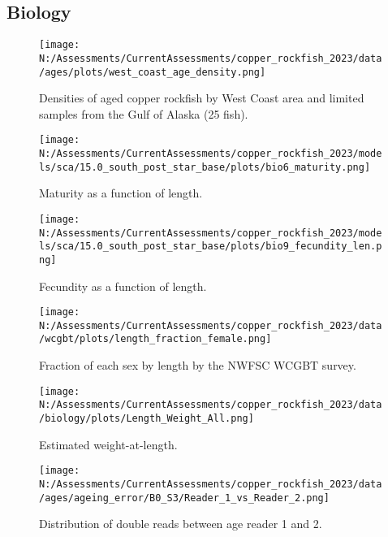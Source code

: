 \documentclass[11pt,
  english,
  letterpaper,
]{article}
\begin{document}
\hypertarget{biology}{%
\subsection{Biology}\label{biology}}

\begin{figure}
\centering
\texttt{[image: N:/Assessments/CurrentAssessments/copper\_rockfish\_2023/data/ages/plots/west\_coast\_age\_density.png]}
\caption{Densities of aged copper rockfish by West Coast area and limited samples from the Gulf of Alaska (25 fish).\label{fig:west-coast-age-density}}
\end{figure}

\pagebreak

\begin{figure}
\centering
\texttt{[image: N:/Assessments/CurrentAssessments/copper\_rockfish\_2023/models/sca/15.0\_south\_post\_star\_base/plots/bio6\_maturity.png]}
\caption{Maturity as a function of length.\label{fig:maturity}}
\end{figure}

\pagebreak

\begin{figure}
\centering
\texttt{[image: N:/Assessments/CurrentAssessments/copper\_rockfish\_2023/models/sca/15.0\_south\_post\_star\_base/plots/bio9\_fecundity\_len.png]}
\caption{Fecundity as a function of length.\label{fig:fecundity}}
\end{figure}

\pagebreak

\begin{figure}
\centering
\texttt{[image: N:/Assessments/CurrentAssessments/copper\_rockfish\_2023/data/wcgbt/plots/length\_fraction\_female.png]}
\caption{Fraction of each sex by length by the NWFSC WCGBT survey.\label{fig:frac-sex-len}}
\end{figure}

\pagebreak

\begin{figure}
\centering
\texttt{[image: N:/Assessments/CurrentAssessments/copper\_rockfish\_2023/data/biology/plots/Length\_Weight\_All.png]}
\caption{Estimated weight-at-length.\label{fig:weight-length}}
\end{figure}

\pagebreak

\begin{figure}
\centering
\texttt{[image: N:/Assessments/CurrentAssessments/copper\_rockfish\_2023/data/ages/ageing\_error/B0\_S3/Reader\_1\_vs\_Reader\_2.png]}
\caption{Distribution of double reads between age reader 1 and 2.\label{fig:age-error-dist}}
\end{figure}
\end{document}
